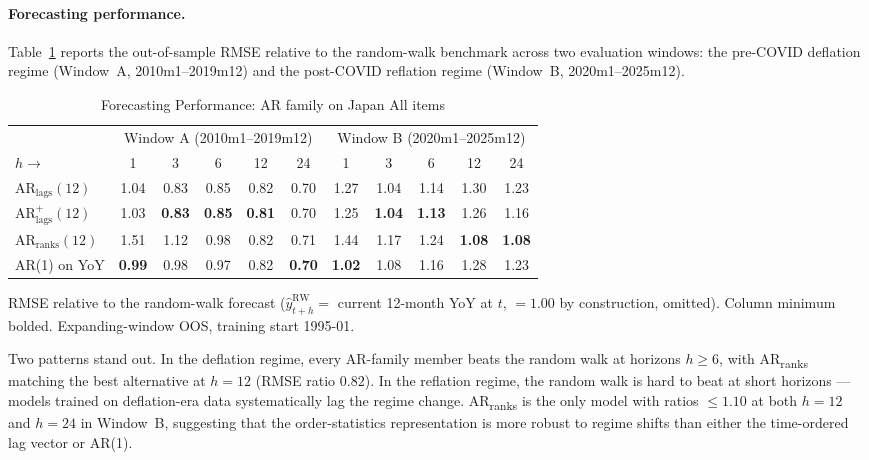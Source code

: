 \paragraph{Forecasting performance.}
Table~\ref{tab:ar_horizon} reports the out-of-sample RMSE relative to the
random-walk benchmark across two evaluation windows: the pre-COVID deflation
regime (Window~A, 2010m1--2019m12) and the post-COVID reflation regime
(Window~B, 2020m1--2025m12).

\begin{table}[htbp]
\centering
\caption{Forecasting Performance: AR family on Japan All items}
\label{tab:ar_horizon}
\begin{tabular}{lcccccccccc}
\toprule
 & \multicolumn{5}{c}{Window A (2010m1--2019m12)} & \multicolumn{5}{c}{Window B (2020m1--2025m12)} \\
\cmidrule(lr){2-6} \cmidrule(lr){7-11}
$h \to$ & 1 & 3 & 6 & 12 & 24 & 1 & 3 & 6 & 12 & 24 \\
\midrule
$\text{AR}_{\text{lags}}(12)$     & 1.04 & 0.83 & 0.85 & 0.82 & 0.70 & 1.27 & 1.04 & 1.14 & 1.30 & 1.23 \\
$\text{AR}^{+}_{\text{lags}}(12)$ & 1.03 & \textbf{0.83} & \textbf{0.85} & \textbf{0.81} & 0.70 & 1.25 & \textbf{1.04} & \textbf{1.13} & 1.26 & 1.16 \\
$\text{AR}_{\text{ranks}}(12)$    & 1.51 & 1.12 & 0.98 & 0.82 & 0.71 & 1.44 & 1.17 & 1.24 & \textbf{1.08} & \textbf{1.08} \\
AR(1) on YoY                      & \textbf{0.99} & 0.98 & 0.97 & 0.82 & \textbf{0.70} & \textbf{1.02} & 1.08 & 1.16 & 1.28 & 1.23 \\
\bottomrule
\end{tabular}
\begin{tablenotes}\footnotesize
\item RMSE relative to the random-walk forecast
($\hat{y}^{\text{RW}}_{t+h} = $ current 12-month YoY at $t$, $=1.00$ by
construction, omitted). Column minimum bolded. Expanding-window OOS,
training start 1995-01.
\end{tablenotes}
\end{table}

Two patterns stand out. In the deflation regime, every AR-family member beats
the random walk at horizons $h \!\ge\! 6$, with AR\textsubscript{ranks} matching
the best alternative at $h\!=\!12$ (RMSE ratio $0.82$). In the reflation
regime, the random walk is hard to beat at short horizons --- models trained
on deflation-era data systematically lag the regime change. AR\textsubscript{ranks}
is the only model with ratios $\le 1.10$ at both $h\!=\!12$ and $h\!=\!24$ in
Window~B, suggesting that the order-statistics representation is more robust
to regime shifts than either the time-ordered lag vector or AR(1).

